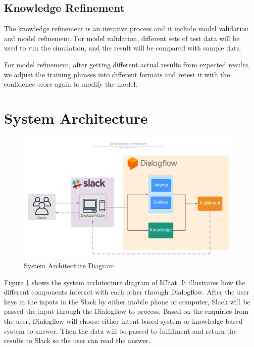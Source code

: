 	\subsection{Knowledge Refinement} %
	\label{sub:knowledge_refinement}
		The knowledge refinement is an iterative process and it include model validation and model refinement. For model validation, different sets of test data will be used to run the simulation, and the result will be compared with sample data.

		For model refinement, after getting different actual results from expected results, we adjust the training phrases into different formats and retest it with the confidence score again to modify the model.


\section{System Architecture} %
\label{sec:system_architecture}

	\begin{figure}[h]
		\centering
		\includegraphics[width=\linewidth]{img/system_architecture.jpeg}
		\caption{System Architecture Diagram}
		\label{fig:system_architecture_diagram}
	\end{figure}
	Figure \ref{fig:system_architecture_diagram} shows the system architecture diagram of IChat. It illustrates how the different components interact with each other through Dialogflow. After the user keys in the inputs in the Slack by either mobile phone or computer, Slack will be passed the input through the Dialogflow to process. Based on the enquiries from the user, Dialogflow will choose either intent-based system or knowledge-based system to answer. Then the data will be passed to fulfillment and return the results to Slack so the user can read the answer.
